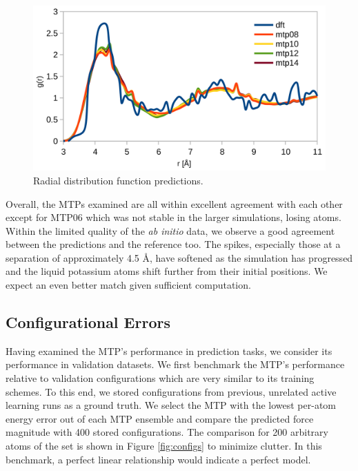 \documentclass[9pt,twocolumn,twoside]{opticajnl}
\begin{document}
\begin{figure}[ht]
  \centering
  \includegraphics[width=\linewidth]{assets/rdf.png}
  \caption{Radial distribution function predictions.}
  \label{fig:rdf}
\end{figure}

Overall, the MTPs examined are all within excellent agreement with each other except for MTP06 which was not stable in the larger simulations, losing atoms. Within the limited quality of the \textit{ab initio} data, we observe a good agreement between the predictions and the reference too. The spikes, especially those at a separation of approximately 4.5 Å, have softened as the simulation has progressed and the liquid potassium atoms shift further from their initial positions. We expect an even better match given sufficient computation.

\subsection{Configurational Errors}
Having examined the MTP's performance in prediction tasks, we consider its performance in validation datasets. We first benchmark the MTP's performance relative to validation configurations which are very similar to its training schemes. To this end, we stored configurations from previous, unrelated active learning runs as a ground truth. We select the MTP with the lowest per-atom energy error out of each MTP ensemble and compare the predicted force magnitude with 400 stored configurations. The comparison for 200 arbitrary atoms of the set is shown in Figure \ref{fig:configs} to minimize clutter. In this benchmark, a perfect linear relationship would indicate a perfect model.
\end{document}
